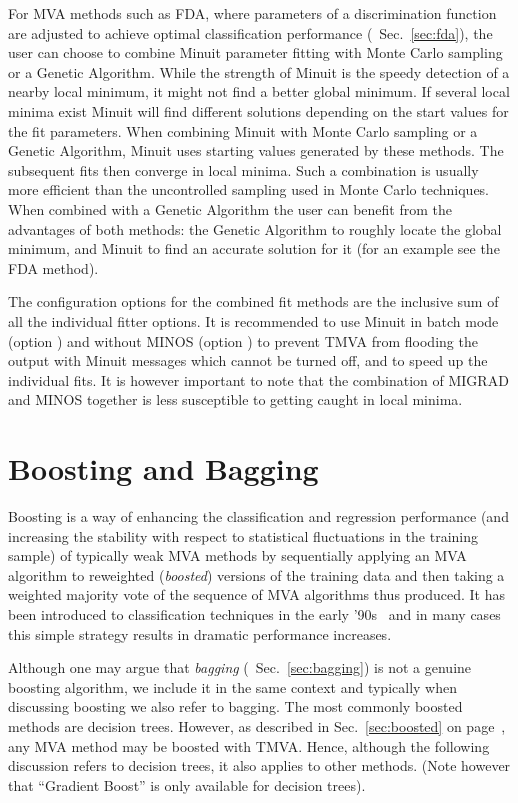 For MVA methods such as FDA, where parameters of a discrimination function
are adjusted to achieve optimal classification performance (\cf\  Sec.~\ref{sec:fda}), 
the user can choose to 
combine Minuit parameter fitting with Monte Carlo sampling or a Genetic Algorithm.
While the strength of Minuit is the speedy detection of a nearby local minimum, 
it might not find a better global minimum. If several local minima exist
Minuit will find different solutions depending on the start values for the fit 
parameters. When combining Minuit with Monte Carlo sampling or a Genetic Algorithm, 
Minuit uses starting values generated by these methods. The subsequent fits then 
converge in local minima. Such a combination is usually more efficient than the
uncontrolled sampling used in Monte Carlo techniques. When combined with a Genetic
Algorithm the user can benefit from the advantages of both methods: the 
Genetic Algorithm to roughly locate the global minimum, and Minuit to find an
accurate solution for it (for an example see the FDA method).

The configuration options for the combined fit methods are the inclusive sum of all 
the individual fitter options. It is recommended to use Minuit in  batch mode 
(option ) and without MINOS (option ) to prevent 
TMVA from flooding the output with Minuit messages which cannot be turned off, and 
to speed up the individual fits. It is however important to note that the combination of 
MIGRAD and MINOS together is less susceptible to getting caught in local minima.


\section{Boosting and Bagging}
\label{sec:boost}

Boosting is a way of enhancing the classification and regression
performance (and increasing the stability with respect to statistical fluctuations
in the training sample) of typically weak MVA methods by sequentially applying an
MVA algorithm to reweighted ({\em boosted}) versions of the training data and then 
taking a weighted majority vote of the sequence of MVA algorithms thus produced. 
It has been introduced to classification techniques in the early '90s~\cite{Boosting} 
and in many cases this simple strategy results in dramatic performance increases.

Although one may argue that {\em bagging} (\cf\  Sec.~\ref{sec:bagging}) is not
a genuine boosting algorithm, we include it in the same context and typically when 
discussing boosting we also refer to bagging.  The most commonly boosted 
methods are decision trees. However, as described in Sec.~\ref{sec:boosted} on
page~\pageref{sec:boosted}, any MVA method may be boosted with TMVA. Hence, although
the following discussion refers to decision trees, it also applies to other methods. 
(Note however that ``Gradient Boost'' is only available for decision trees).

